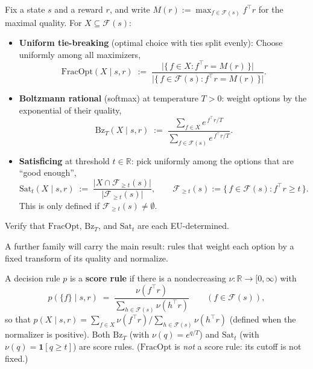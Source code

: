 \documentclass[11pt]{article}
\newcommand{\R}{\mathbb{R}}
\newcommand{\F}{\mathcal{F}}       %
\begin{document}
\begin{definition}\label{def:rules}
Fix a state $s$ and a reward $r$, and write $M(r) := \max_{f \in \F(s)} f^\top r$ for the
maximal quality.  For $X \subseteq \F(s)$:
\begin{itemize}\itemsep=5pt
  \item \textbf{Uniform tie-breaking} (optimal choice with ties split evenly): Choose uniformly among all maximizers,
  $$
  \mathrm{FracOpt}(X \mid s, r) \;:=\;
  \frac{\bigl|\{\, f \in X : f^\top r = M(r) \,\}\bigr|}{\bigl|\{\, f \in \F(s) : f^\top r = M(r) \,\}\bigr|}.
  $$
  \item \textbf{Boltzmann rational} (softmax) at temperature $T > 0$: weight options by the
  exponential of their quality,
  $$
  \mathrm{Bz}_T(X \mid s, r) \;:=\;
  \frac{\sum_{f \in X} e^{\,f^\top r / T}}{\sum_{f \in \F(s)} e^{\,f^\top r / T}}.
  $$
  \item \textbf{Satisficing} at threshold $t \in \R$: pick uniformly among the options that
  are ``good enough'',
  $$
  \mathrm{Sat}_t(X \mid s, r) \;:=\; \frac{\bigl|X \cap \F_{\ge t}(s)\bigr|}{\bigl|\F_{\ge t}(s)\bigr|},
  \qquad \F_{\ge t}(s) := \{\, f \in \F(s) : f^\top r \ge t \,\}.
  $$
  This is only defined if $\F_{\ge t}(s) \neq \emptyset$.
\end{itemize}
\end{definition}

\begin{exercise}
\label{prob:rules_eu} Verify that $\mathrm{FracOpt}$, $\mathrm{Bz}_T$, and
$\mathrm{Sat}_t$ are each EU-determined.
\end{exercise}


A further family will carry the main result: rules that weight each option by a fixed transform of
its quality and normalize.

\begin{definition}\label{def:score_rule}
A decision rule $p$ is a \textbf{score rule} if there is a nondecreasing
$\nu : \R \to [0,\infty)$ with
$$
p(\{f\}\mid s, r) \;=\; \frac{\nu(f^\top r)}{\sum_{h\in\F(s)}\nu(h^\top r)} \qquad (f \in \F(s)),
$$
so that $p(X\mid s,r) = \sum_{f\in X}\nu(f^\top r)\big/\sum_{h\in\F(s)}\nu(h^\top r)$ (defined when
the normalizer is positive). Both $\mathrm{Bz}_T$ (with $\nu(q) = e^{q/T}$) and $\mathrm{Sat}_t$
(with $\nu(q) = \mathbf{1}[q\ge t]$) are score rules. ($\mathrm{FracOpt}$ is \emph{not} a score
rule: its cutoff is not fixed.)
\end{definition}
\end{document}
